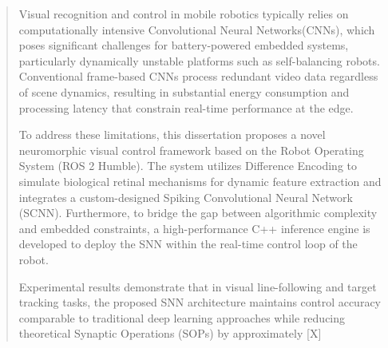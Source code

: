 \newpage

\begin{abstract}
   Visual recognition and control in mobile robotics typically relies on computationally intensive Convolutional Neural Networks(CNNs),
   which poses significant challenges for battery-powered embedded systems, particularly dynamically unstable platforms such as self-balancing 
   robots. Conventional frame-based CNNs process redundant video data regardless of scene dynamics, resulting in substantial energy consumption 
   and processing latency that constrain real-time performance at the edge.

To address these limitations, this dissertation proposes a novel neuromorphic visual control framework based on the Robot Operating System 
(ROS 2 Humble). The system utilizes Difference Encoding to simulate biological retinal mechanisms for dynamic feature extraction and integrates 
a custom-designed Spiking Convolutional Neural Network (SCNN). Furthermore, to bridge the gap between algorithmic complexity and embedded constraints, 
a high-performance C++ inference engine is developed to deploy the SNN within the real-time control loop of the robot.

Experimental results demonstrate that in visual line-following and target tracking tasks, the proposed SNN architecture maintains control accuracy 
comparable to traditional deep learning approaches while reducing theoretical Synaptic Operations (SOPs) by approximately [X]
\end{abstract}
\clearpage
\newpage